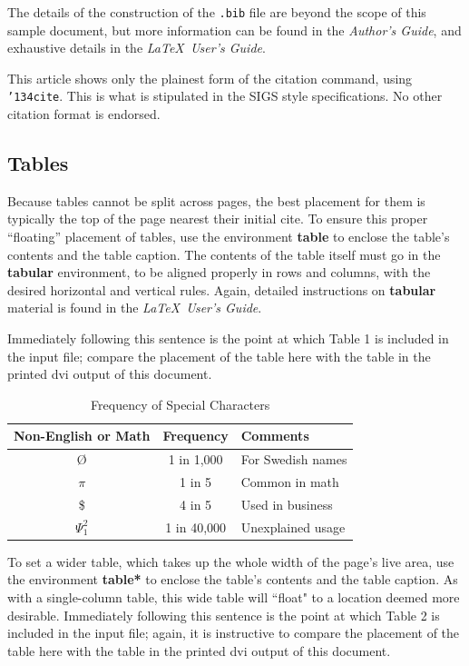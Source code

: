 \documentclass{acm_proc_article-sp}
\begin{document}
The details of the construction of the \texttt{.bib} file
are beyond the scope of this sample document, but more
information can be found in the \textit{Author's Guide},
and exhaustive details in the \textit{\LaTeX\ User's
Guide}\cite{Lamport:LaTeX}.

This article shows only the plainest form
of the citation command, using \texttt{{\char'134}cite}.
This is what is stipulated in the SIGS style specifications.
No other citation format is endorsed.

\subsection{Tables}
Because tables cannot be split across pages, the best
placement for them is typically the top of the page
nearest their initial cite.  To
ensure this proper ``floating'' placement of tables, use the
environment \textbf{table} to enclose the table's contents and
the table caption.  The contents of the table itself must go
in the \textbf{tabular} environment, to
be aligned properly in rows and columns, with the desired
horizontal and vertical rules.  Again, detailed instructions
on \textbf{tabular} material
is found in the \textit{\LaTeX\ User's Guide}.

Immediately following this sentence is the point at which
Table 1 is included in the input file; compare the
placement of the table here with the table in the printed
dvi output of this document.

\begin{table}
\centering
\caption{Frequency of Special Characters}
\begin{tabular}{|c|c|l|} \hline
Non-English or Math&Frequency&Comments\\ \hline
\O & 1 in 1,000& For Swedish names\\ \hline
$\pi$ & 1 in 5& Common in math\\ \hline
\$ & 4 in 5 & Used in business\\ \hline
$\Psi^2_1$ & 1 in 40,000& Unexplained usage\\
\hline\end{tabular}
\end{table}

To set a wider table, which takes up the whole width of
the page's live area, use the environment
\textbf{table*} to enclose the table's contents and
the table caption.  As with a single-column table, this wide
table will ``float" to a location deemed more desirable.
Immediately following this sentence is the point at which
Table 2 is included in the input file; again, it is
instructive to compare the placement of the
table here with the table in the printed dvi
output of this document.
\end{document}

